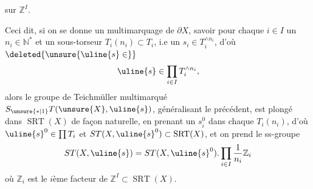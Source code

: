  sur $\mathbb Z^I$.



Ceci dit, si on se donne un
multimarquage de $\partial X$, savoir pour
chaque $i\in I$ un $n_i\in\mathbb N^*$ et un
sous-torseur
$T_i(n_i)\subset T_i$,
 i.e
un $s_i\in T_i^{\wedge n_i}$, d'où
$\deleted{\unsure{\uline{s}\in}}$
\[
\uline{s}\in\prod_{i\in I}T_i^{\wedge n_i},
\]
alors le groupe de Teichmüller multimarqué
$S_{\unsure{*|1}}T(\unsure{X},\uline{s})$,
généralisant le précédent, est
plongé dans $\operatorname{SRT}(X)$ de façon naturelle,
en prenant un $s_i^0$ dans chaque $T_i(n_i)$, d'où
$\uline{s}^0\in\prod T_i$ et
$ST(X,\uline{s}^0)\subset\operatorname{SRT}(X)$,
et on prend le ss-groupe
\[
ST(X,\uline{s})=ST(X,\uline{s}^0).
\prod_{i\in I}\frac1{n_i}\mathbb Z_i
\]
où $\mathbb Z_i$ est le $i$ème facteur de
$\mathbb Z^I\subset\operatorname{SRT}(X)$.

